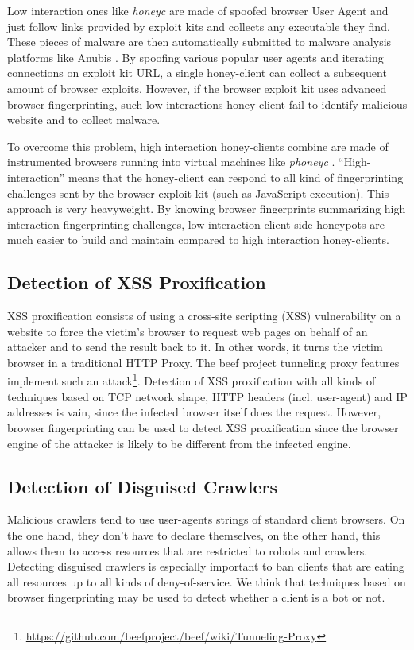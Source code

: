 \documentclass[10pt]{IEEEtran}
\begin{document}
Low interaction ones like \textit{honeyc} \cite{seifert2007honeyc} are made of 
spoofed browser User Agent and just follow links provided by exploit kits and
collects any executable they find. These pieces of malware are then 
automatically submitted to malware analysis platforms like Anubis 
\cite{bayer2006dynamic}. By spoofing various popular user agents and iterating
connections on exploit kit URL, a single honey-client can collect a subsequent
amount of browser exploits. 
However, if the browser exploit kit uses advanced browser fingerprinting, such
low interactions honey-client fail to identify malicious website and to collect
malware.


To overcome this problem, high interaction honey-clients combine are made of 
instrumented browsers running into virtual machines like \textit{phoneyc} 
\cite{nazario2009phoneyc}. 
``High-interaction'' means that the honey-client can respond to all kind of 
fingerprinting challenges sent by the browser exploit kit (such as JavaScript 
execution).
This approach is very heavyweight.
By knowing browser fingerprints summarizing high interaction 
fingerprinting challenges, low interaction client side honeypots are much 
easier to build and maintain compared to high interaction honey-clients.




\subsection{Detection of XSS Proxification}
XSS proxification consists of using a cross-site scripting (XSS) vulnerability on a website to 
force the victim's browser to request web pages on behalf of an attacker and to send the result 
back to it. In other words, it turns the victim browser in a traditional HTTP Proxy. 
The beef project tunneling proxy features implement such an 
attack\footnote{\url{https://github.com/beefproject/beef/wiki/Tunneling-Proxy}}. 
Detection of XSS proxification with all kinds of techniques based on TCP network shape, 
HTTP headers (incl. user-agent) and IP addresses is vain, since the infected browser itself does 
the request.
However, browser fingerprinting can be used to detect XSS proxification since the 
browser engine of the attacker is likely to be different from the infected engine.




\subsection{Detection of Disguised Crawlers}
Malicious crawlers tend to use user-agents strings of standard client browsers.
On the one hand, they don't have to declare themselves, on the other hand, this allows them 
to access resources that are restricted to robots and crawlers.
Detecting disguised crawlers is especially important to ban clients that are eating all 
resources up to all kinds of deny-of-service.
We think that techniques based on browser fingerprinting may be used to detect whether a client is a 
bot or not.
\end{document}
